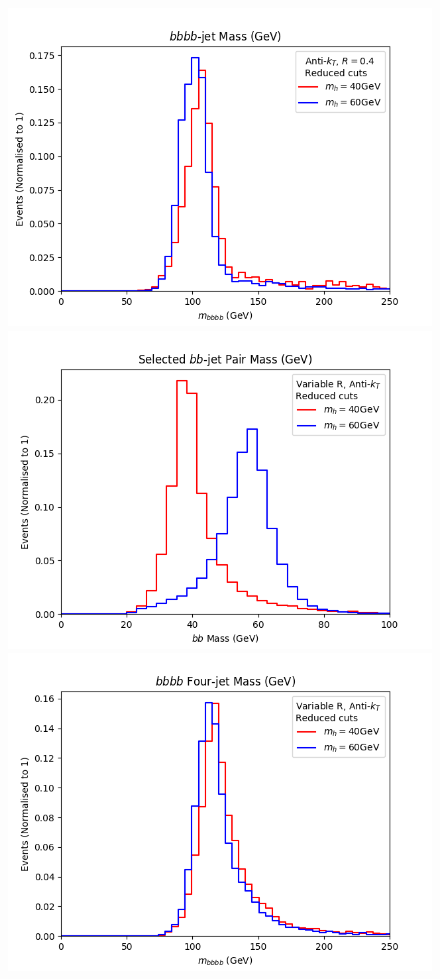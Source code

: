 \begin{figure}[htb!]
	\includegraphics[scale=0.5]{plots/bbbbmass_AK4_lowptcut.png}
	\includegraphics[scale=0.5]{plots/bbmass_varR_lowptcut.png}
	\includegraphics[scale=0.5]{plots/bbbbmass_varR_lowptcut.png}

\end{figure}
